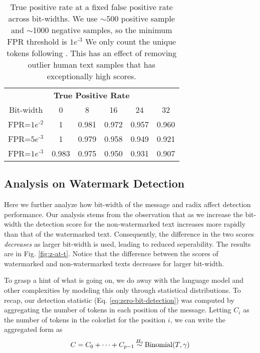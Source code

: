 \begin{table}[t]
    \centering
    \begin{tabular}{c|ccccc}
        \toprule
        \multicolumn{6}{c}{\textbf{True Positive Rate}} \\ 
        \multicolumn{1}{c}{Bit-width} &  0 & 8 & 16 & 24 & 32 \\ \hline
        FPR=$1e^\text{-2}$ & 1 &	0.981 &	0.972&	0.957&	0.960\\
        FPR=$5e^\text{-3}$ & 1	&0.979	&0.958	&0.949	&0.921\\ 
        FPR=$1e^\text{-3}$ & 0.983&	0.975&	0.950	&0.931	&0.907 \\ 
        \bottomrule
    \end{tabular}
    \caption{True positive rate at a fixed false positive rate across bit-widths. We use $\sim 500$ positive sample and $\sim$1000 negative samples, so the minimum FPR threshold is $1e^\text{-3}$
    We only count the unique tokens following \citep{kirchenbauer2023watermark, fernandez2023three}. This has an effect of removing outlier human text samples that has exceptionally high scores.
}  \label{tab:tpr}
\end{table}


\subsection{Analysis on Watermark Detection}\label{appendix:detection-analysis}
Here we further analyze how bit-width of the message and radix affect detection performance. Our analysis stems from the observation that as we increase the bit-width the detection score for the non-watermarked text increases more rapidly than that of the watermarked text. Consequently, the difference in the two scores \textit{decreases} as larger bit-width is used, leading to reduced seperability. The results are in Fig. \ref{fig:z-at-t}. Notice that the difference between the scores of watermarked and non-watermarked texts decreases for larger bit-width.

To grasp a hint of what is going on, we do away with the language model and other complexities by modeling this only through statistical distributions. To recap, our detection statistic (Eq. \ref{eq:zero-bit-detection}) was computed by aggregating the number of tokens in each position of the message. Letting $C_i$ as the number of tokens in the colorlist for the position $i$, we can write the aggregated form as 
\begin{equation}
    C = C_0 + \cdots + C_{p-1} \distas{H_0} \text{Binomial}(T, \gamma)
\end{equation}




